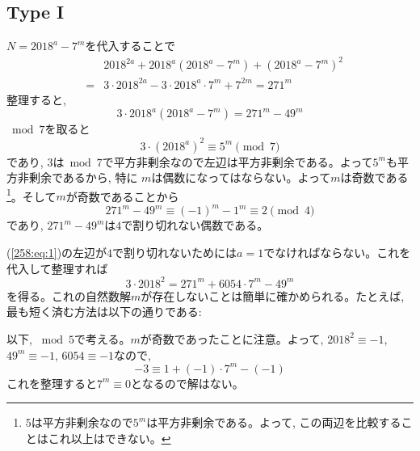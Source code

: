 \subsection*{Type I}
$N=2018^{a} - 7^{m}$を代入することで
\begin{eqnarray*} 
& &2018^{2a} + 2018^{a}(2018^{a} - 7^m) + (2018^{a} - 7^{m})^2 \\
&=& 3\cdot 2018^{2a} -3\cdot 2018^{a}\cdot 7^{m} + 7^{2m} = 271^m
\end{eqnarray*}
整理すると, 
\begin{equation} \label{258:eq:1}
3\cdot 2018^{a}(2018^{a} - 7^m) = 271^{m} - 49^{m}
\end{equation}
$\bmod{7}$を取ると
\[3\cdot (2018^{a})^{2} \equiv 5^{m}\pmod{7}\]
であり, $3$は$\bmod{7}$で平方非剰余なので左辺は平方非剰余である。よって$5^{m}$も平方非剰余であるから, 特に $m$は偶数になってはならない。よって$m$は奇数である\footnote{$5$は平方非剰余なので$5^{m}$は平方非剰余である。よって, この両辺を比較することはこれ以上はできない。}。そして$m$が奇数であることから
\[271^{m} - 49^{m} \equiv (-1)^{m} - 1^{m} \equiv 2\pmod{4}\]
であり, $271^{m} - 49^{m}$は$4$で割り切れない偶数である。\par 
(\ref{258:eq:1})の左辺が$4$で割り切れないためには$a=1$でなければならない。これを代入して整理すれば
\[3\cdot 2018^2 = 271^{m} + 6054\cdot 7^{m} - 49^{m} \]
を得る。これの自然数解$m$が存在しないことは簡単に確かめられる。たとえば, 最も短く済む方法は以下の通りである: \par 
以下, $\bmod{5}$で考える。$m$が奇数であったことに注意。よって, $2018^{2} \equiv -1$, $49^{m} \equiv -1$, $6054\equiv -1$なので, 
\[-3 \equiv 1 + (-1)\cdot 7^{m} - (-1)\]
これを整理すると$7^{m} \equiv 0$となるので解はない。
